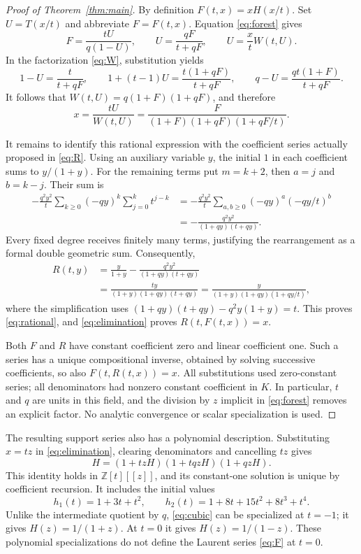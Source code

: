 \documentclass[11pt]{article}
\newcommand{\Z}{\mathbb{Z}}
\begin{document}
\begin{proof}[Proof of Theorem~\ref{thm:main}]
By definition $F(t,x)=xH(x/t)$. Set $U=T(x/t)$ and abbreviate $F=F(t,x)$.
Equation \eqref{eq:forest} gives
\begin{equation}\label{eq:U}
 F=\frac{tU}{q(1-U)},\qquad
 U=\frac{qF}{t+qF},\qquad U=\frac{x}{t}W(t,U).
\end{equation}
In the factorization \eqref{eq:W}, substitution yields
\[
 1-U=\frac{t}{t+qF},\qquad
 1+(t-1)U=\frac{t(1+qF)}{t+qF},\qquad
 q-U=\frac{qt(1+F)}{t+qF}.
\]
It follows that $W(t,U)=q(1+F)(1+qF)$, and therefore
\begin{equation}\label{eq:elimination}
 x=\frac{tU}{W(t,U)}
   =\frac{F}{(1+F)(1+qF)(1+qF/t)}.
\end{equation}

It remains to identify this rational expression with the coefficient
series actually proposed in \eqref{eq:R}. Using an auxiliary variable $y$,
the initial $1$ in each coefficient sums to $y/(1+y)$. For the remaining
terms put $m=k+2$, then $a=j$ and $b=k-j$. Their sum is
\begin{align*}
 -\frac{q^2y^2}{t}\sum_{k\geq0}(-qy)^k\sum_{j=0}^k t^{j-k}
 &=-\frac{q^2y^2}{t}\sum_{a,b\geq0}(-qy)^a(-qy/t)^b\\
 &=-\frac{q^2y^2}{(1+qy)(t+qy)}.
\end{align*}
Every fixed degree receives finitely many terms, justifying the
rearrangement as a formal double geometric sum. Consequently,
\begin{align*}
 R(t,y)&=\frac{y}{1+y}-\frac{q^2y^2}{(1+qy)(t+qy)}\\
 &=\frac{ty}{(1+y)(1+qy)(t+qy)}
 =\frac{y}{(1+y)(1+qy)(1+qy/t)},
\end{align*}
where the simplification uses
$(1+qy)(t+qy)-q^2y(1+y)=t$. This proves \eqref{eq:rational}, and
\eqref{eq:elimination} proves $R(t,F(t,x))=x$.

Both $F$ and $R$ have constant coefficient zero and linear coefficient
one. Such a series has a unique compositional inverse, obtained by solving
successive coefficients, so also $F(t,R(t,x))=x$.
All substitutions used zero-constant series; all denominators had nonzero
constant coefficient in $K$. In particular, $t$ and $q$ are units in this
field, and the division by $z$ implicit in \eqref{eq:forest} removes an
explicit factor. No analytic convergence or scalar specialization is used.
\end{proof}

The resulting support series also has a polynomial description. Substituting
$x=tz$ in \eqref{eq:elimination}, clearing denominators and cancelling $tz$
gives
\begin{equation}\label{eq:cubic}
 H=(1+tzH)(1+tqzH)(1+qzH).
\end{equation}
This identity holds in $\Z[t][[z]]$, and its constant-one solution is unique
by coefficient recursion. It includes the initial values
\[
 h_1(t)=1+3t+t^2,\qquad h_2(t)=1+8t+15t^2+8t^3+t^4.
\]
Unlike the intermediate quotient by $q$, \eqref{eq:cubic} can be specialized
at $t=-1$; it gives $H(z)=1/(1+z)$. At $t=0$ it gives $H(z)=1/(1-z)$.
These polynomial specializations do not define the Laurent series
\eqref{eq:F} at $t=0$.
\end{document}

